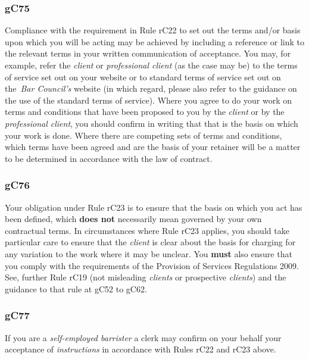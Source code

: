 

\subsubsection{\color{darkgrey}gC75}

Compliance with the requirement in Rule rC22 to set out the terms and/or
basis upon which you will be acting may be achieved by including a
reference or link to the relevant terms in your written communication of
acceptance. You may, for example, refer the \emph{client} or
\emph{professional client} (as the case may be) to the terms of service
set out on your website or to standard terms of service set out on
the~\emph{Bar Council's} website (in which regard, please also refer to
the guidance on the use of the standard terms of service). Where you
agree to do your work on terms and conditions that have been proposed to
you by the \emph{client} or by the \emph{professional client}, you
should confirm in writing that that is the basis on which your work is
done. Where there are competing sets of terms and conditions, which
terms have been agreed and are the basis of your retainer will be a
matter to be determined in accordance with the law of contract.

\subsubsection{\color{darkgrey}gC76}

Your obligation under Rule rC23 is to ensure that the basis on which you
act has been defined, which \textcolor{myred}{\textbf{does not}} necessarily mean governed by your
own contractual terms. In circumstances where Rule rC23 applies, you
should take particular care to ensure that the \emph{client} is clear
about the basis for charging for any variation to the work where it may
be unclear. You \textcolor{myred}{\textbf{must}} also ensure that you comply with the requirements
of the Provision of Services Regulations 2009. See, further Rule rC19
(not misleading \emph{clients} or prospective \emph{clients}) and the
guidance to that rule at gC52 to gC62.

\subsubsection{\color{darkgrey}gC77}

If you are a \emph{self-employed barrister} a clerk may confirm on your
behalf your acceptance of \emph{instructions} in accordance with Rules
rC22 and rC23 above.

